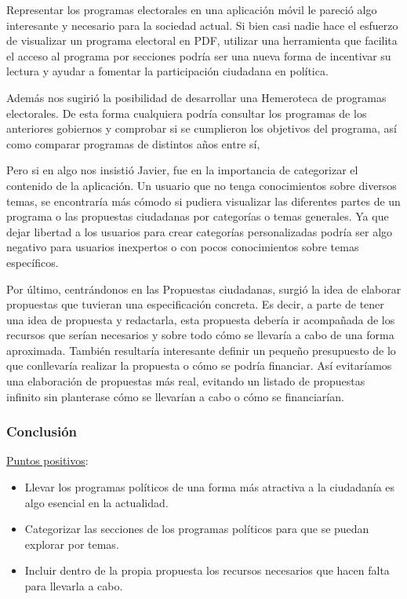 Representar los programas electorales en una aplicación móvil le pareció algo interesante y necesario para la sociedad actual. Si bien casi nadie hace el esfuerzo de visualizar un programa electoral en PDF, utilizar una herramienta que facilita el acceso al programa por secciones podría ser una nueva forma de incentivar su lectura y ayudar a fomentar la participación ciudadana en política. 

Además nos sugirió la posibilidad de desarrollar una Hemeroteca de programas electorales. De esta forma cualquiera podría consultar los programas de los anteriores gobiernos y comprobar si se cumplieron los objetivos del programa, así como comparar programas de distintos años entre sí, 

Pero si en algo nos insistió Javier, fue en la importancia de categorizar el contenido de la aplicación. Un usuario que no tenga conocimientos sobre diversos temas, se encontraría más cómodo si pudiera visualizar las diferentes partes de un programa o las propuestas ciudadanas por categorías o temas generales. Ya que dejar libertad a los usuarios para crear categorías personalizadas podría ser algo negativo para usuarios inexpertos o con pocos conocimientos sobre temas específicos.

Por último, centrándonos en las Propuestas ciudadanas, surgió la idea de elaborar propuestas que tuvieran una especificación concreta. Es decir, a parte de tener una idea de propuesta y redactarla, esta propuesta debería ir acompañada de los recursos que serían necesarios y sobre todo cómo se llevaría a cabo de una forma aproximada. También resultaría interesante definir un pequeño presupuesto de lo que conllevaría realizar la propuesta o cómo se podría financiar. Así evitaríamos una elaboración de propuestas más real, evitando un listado de propuestas infinito sin planterase cómo se llevarían a cabo o cómo se financiarían.

\subsubsection{Conclusión}

\underline{Puntos positivos}:

\begin{itemize}
  \item Llevar los programas políticos de una forma más atractiva a la ciudadanía es algo esencial en la actualidad.
  \item Categorizar las secciones de los programas políticos para que se puedan explorar por temas. 
  \item Incluir dentro de la propia propuesta los recursos necesarios que hacen falta para llevarla a cabo.
\end{itemize}

